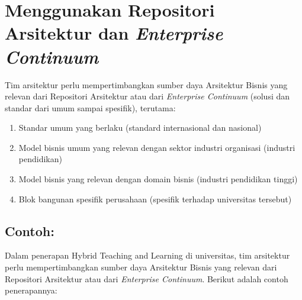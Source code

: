 \section{Menggunakan Repositori Arsitektur dan \textit{Enterprise Continuum}}
Tim arsitektur perlu mempertimbangkan sumber daya Arsitektur Bisnis yang relevan dari Repositori Arsitektur atau dari \textit{Enterprise Continuum} (solusi dan standar dari umum sampai spesifik), terutama:
\begin{enumerate}
	\item Standar umum yang berlaku (standard internasional dan nasional)
	\item Model bisnis umum yang relevan dengan sektor industri organisasi (industri pendidikan)
	\item Model bisnis yang relevan dengan domain bisnis (industri pendidikan tinggi)
	\item Blok bangunan spesifik perusahaan (spesifik terhadap universitas tersebut)
\end{enumerate}

\subsection{Contoh:}
Dalam penerapan Hybrid Teaching and Learning di universitas, tim arsitektur perlu mempertimbangkan sumber daya Arsitektur Bisnis yang relevan dari Repositori Arsitektur atau dari \textit{Enterprise Continuum}. Berikut adalah contoh penerapannya:

